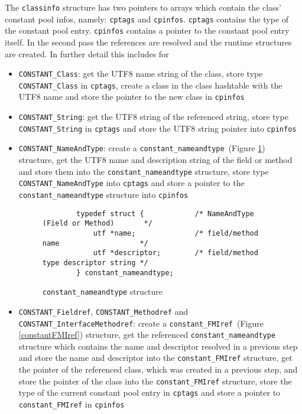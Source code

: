 The \texttt{classinfo} structure has two pointers to arrays which
contain the class' constant pool infos, namely: \texttt{cptags} and
\texttt{cpinfos}. \texttt{cptags} contains the type of the constant
pool entry. \texttt{cpinfos} contains a pointer to the constant pool
entry itself. In the second pass the references are resolved and the
runtime structures are created. In further detail this includes for

\begin{itemize}
 \item \texttt{CONSTANT\_Class}: get the UTF8 name string of the
 class, store type \texttt{CONSTANT\_Class} in \texttt{cptags}, create
 a class in the class hashtable with the UTF8 name and store the
 pointer to the new class in \texttt{cpinfos}

 \item \texttt{CONSTANT\_String}: get the UTF8 string of the
 referenced string, store type \texttt{CONSTANT\_String} in
 \texttt{cptags} and store the UTF8 string pointer into
 \texttt{cpinfos}

 \begingroup
 \item \texttt{CONSTANT\_NameAndType}: create a
 \texttt{constant\_nameandtype}~(Figure \ref{constantnameandtype})
 structure, get the UTF8 name and description string of the field or
 method and store them into the \texttt{constant\_nameandtype}
 structure, store type \texttt{CONSTANT\_NameAndType} into
 \texttt{cptags} and store a pointer to the
 \texttt{constant\_nameandtype} structure into \texttt{cpinfos}

 \endgroup

\begin{figure}[h]
\begin{verbatim}
        typedef struct {            /* NameAndType (Field or Method)       */
            utf *name;              /* field/method name                   */
            utf *descriptor;        /* field/method type descriptor string */
        } constant_nameandtype;
\end{verbatim}
\caption{\texttt{constant\_nameandtype} structure}
\label{constantnameandtype}
\end{figure}

 \begingroup
 \item \texttt{CONSTANT\_Fieldref}, \texttt{CONSTANT\_Methodref} and
 \texttt{CONSTANT\_InterfaceMethodref}: create a
 \texttt{constant\_FMIref}~(Figure \ref{constantFMIref}) structure,
 get the referenced \texttt{constant\_nameandtype} structure which
 contains the name and descriptor resolved in a previous step and
 store the name and descriptor into the \texttt{constant\_FMIref}
 structure, get the pointer of the referenced class, which was created
 in a previous step, and store the pointer of the class into the
 \texttt{constant\_FMIref} structure, store the type of the current
 constant pool entry in \texttt{cptags} and store a pointer to
 \texttt{constant\_FMIref} in \texttt{cpinfos}


\end{itemize}
